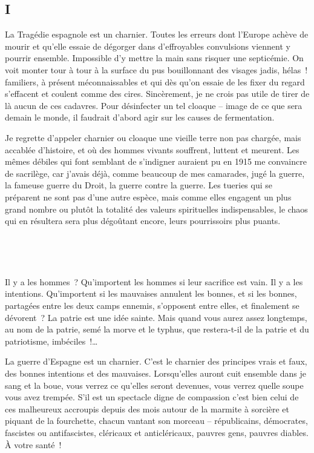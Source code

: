 \documentclass[french,twoside]{book} %
\newcommand{\astertri}{\medskip\par\centerline{\color{rubric}\large\selectfont{\syms ✻\,✻\,✻}}\medskip\par}%
\begin{document}
\subsection[{I}]{I}
\noindent La Tragédie espagnole est un charnier. Toutes les erreurs dont l’Europe achève de mourir et qu’elle essaie de dégorger dans d’effroyables convulsions viennent y pourrir ensemble. Impossible d’y mettre la main sans risquer une septicémie. On voit monter tour à tour à la surface du pus bouillonnant des visages jadis, hélas ! familiers, à présent méconnaissables et qui dès qu’on essaie de les fixer du regard s’effacent et coulent comme des cires. Sincèrement, je ne crois pas utile de tirer de là aucun de ces cadavres. Pour désinfecter un tel cloaque – image de ce que sera demain le monde, il faudrait d’abord agir sur les causes de fermentation.\par
Je regrette d’appeler charnier ou cloaque une vieille terre non pas chargée, mais accablée d’histoire, et où des hommes vivants souffrent, luttent et meurent. Les mêmes débiles qui font semblant de s’indigner auraient pu en 1915 me convaincre de sacrilège, car j’avais déjà, comme beaucoup de mes camarades, jugé la guerre, la fameuse guerre du Droit, la guerre contre la guerre. Les tueries qui se préparent ne sont pas d’une autre espèce, mais comme elles engagent un plus grand nombre ou plutôt la totalité des valeurs spirituelles indispensables, le chaos qui en résultera sera plus dégoûtant encore, leurs pourrissoirs plus puants.\par
 \par

\astertri

\noindent  \par
Il y a les hommes ? Qu’importent les hommes si leur sacrifice est vain. Il y a les intentions. Qu’importent si les mauvaises annulent les bonnes, et si les bonnes, partagées entre les deux camps ennemis, s’opposent entre elles, et finalement se dévorent ? La patrie est une idée sainte. Mais quand vous aurez assez longtemps, au nom de la patrie, semé la morve et le typhus, que restera-t-il de la patrie et du patriotisme, imbéciles !…\par
La guerre d’Espagne est un charnier. C’est le charnier des principes vrais et faux, des bonnes intentions et des mauvaises. Lorsqu’elles auront cuit ensemble dans je sang et la boue, vous verrez ce qu’elles seront devenues, vous verrez quelle soupe vous avez trempée. S’il est un spectacle digne de compassion c’est bien celui de ces malheureux accroupis depuis des mois autour de la marmite à sorcière et piquant de la fourchette, chacun vantant son morceau – républicains, démocrates, fascistes ou antifascistes, cléricaux et anticléricaux, pauvres gens, pauvres diables. À votre santé !\par
 \par
\end{document}
